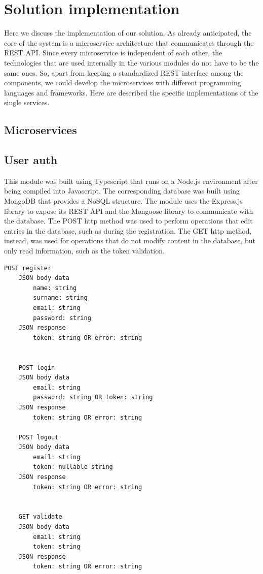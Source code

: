 \section{Solution implementation}
Here we discuss the implementation of our solution. As already anticipated,
the core of the system is a microservice architecture that communicates
through the REST API. Since every microservice is independent of each
other, the technologies that are used internally in the various modules
do not have to be the same ones. So, apart from keeping a standardized REST
interface among the components, we could develop the microservices with
different programming languages and frameworks. Here are described the
specific implementations of the single services.

\subsection{Microservices}


\subsection{User auth}

This module was built using Typescript that runs on a Node.js environment after
being compiled into Javascript. The corresponding database was built using MongoDB
that provides a NoSQL structure. The module uses the Express.js library to expose
its REST API and the Mongoose library to communicate with the database. The POST http
method was used to perform operations that edit entries in the database, such as
during the registration. The GET http method, instead, was used for operations that
do not modify content in the database, but only read information, such as the token
validation.\\


\begin{lstlisting}[language=bash,caption={User auth exposed API}]
    POST register
    JSON body data
        name: string
        surname: string
        email: string
        password: string
    JSON response
        token: string OR error: string

        
    POST login
    JSON body data
        email: string
        password: string OR token: string
    JSON response
        token: string OR error: string

    POST logout
    JSON body data
        email: string
        token: nullable string
    JSON response
        token: string OR error: string

        
    GET validate
    JSON body data
        email: string
        token: string
    JSON response
        token: string OR error: string
\end{lstlisting}


